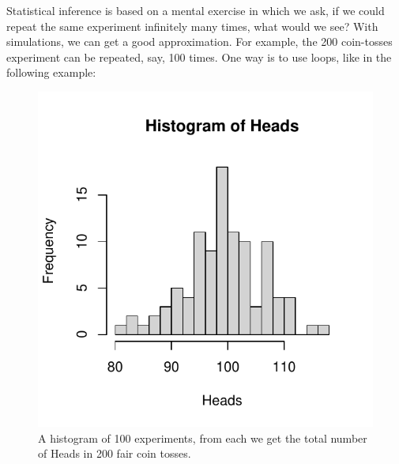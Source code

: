 Statistical inference is based on a mental exercise in which we ask, if we could repeat the same experiment infinitely many times, what would we see? With simulations, we can get a good approximation. For example, the 200 coin-tosses experiment can be repeated, say, 100 times. One way is to use loops, like in the following example:
\begin{knitrout}
\color{fgcolor}\begin{kframe}
\begin{alltt}
\hlstd{(}\hlstd{)}
 \hlkwb{<-}   
 \hlkwb{<-}   
 \hlkwb{<-} \hlstd{(}  
   \hlopt{:}
   \hlkwb{<-} \hlstd{((} \hlopt{<} \hlstd{))}
\hlstd{\}}
 \hlstd{=}\hlstd{)}
\end{alltt}
\end{kframe}\begin{figure}

{\centering \includegraphics[width=\maxwidth]{figure/intro-heads2-1} 

}

\caption[A histogram of 100 experiments, from each we get the total number of Heads in 200 fair coin tosses]{A histogram of 100 experiments, from each we get the total number of Heads in 200 fair coin tosses.}\label{fig:intro-heads2}
\end{figure}

\end{knitrout}


